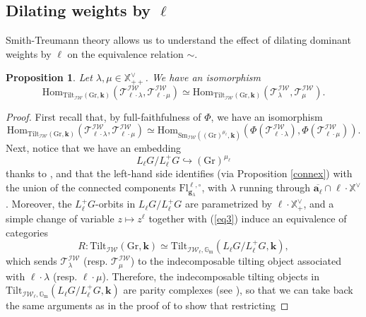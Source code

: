 \documentclass[11pt]{amsart}
\theoremstyle{plain}
\newtheorem{prop}[thm]{Proposition}
\theoremstyle{remark}
\numberwithin{equation}{section}
\begin{document}
	\subsection{Dilating weights by $\ell$}
	Smith-Treumann theory allows us to understand the effect of dilating dominant weights by $\ell$ on the equivalence relation $\sim$.
	\begin{prop}\label{red to non special}
		Let $\lambda,\mu\in\mathbb{X}^\vee_{++}$. We have an isomorphism
		$$\mathrm{Hom}_{\mathrm{Tilt}_\mathcal{IW}(\mathrm{Gr},\mathbf{k})}(\mathscr{T}^\mathcal{IW}_{\ell\cdot\lambda},\mathscr{T}^\mathcal{IW}_{\ell\cdot\mu})\simeq \mathrm{Hom}_{\mathrm{Tilt}_\mathcal{IW}(\mathrm{Gr},\mathbf{k})}(\mathscr{T}^\mathcal{IW}_{\lambda},\mathscr{T}^\mathcal{IW}_{\mu}).$$
	\end{prop}
	\begin{proof}
	    First recall that, by full-faithfulness of $\Phi$, we have an isomorphism
	    \begin{equation}\label{fulfaith1}
	        \mathrm{Hom}_{\mathrm{Tilt}_\mathcal{IW}(\mathrm{Gr},\mathbf{k})}(\mathscr{T}^\mathcal{IW}_{\ell\cdot\lambda},\mathscr{T}^\mathcal{IW}_{\ell\cdot\mu})\simeq\mathrm{Hom}_{\mathrm{Sm}_{\mathcal{IW}}((\mathrm{Gr})^{\mu_\ell},\mathbf{k})}(\Phi(\mathscr{T}^\mathcal{IW}_{\ell\cdot\lambda}),\Phi(\mathscr{T}^\mathcal{IW}_{\ell\cdot\mu})). 
	    \end{equation}
	    Next, notice that we have an embedding $$L_\ell G/L^+_\ell G\hookrightarrow (\mathrm{Gr})^{\mu_\ell}$$ thanks to \cite[Remark 4.8]{riche2020smithtreumann}, and that the left-hand side identifies (via Proposition \ref{connex}) with the union of the connected components $\mathrm{Fl}^{\ell,\circ}_{\mathbf{g}_\lambda}$, with $\lambda$ running through $\overline{\mathbf{a}_\ell}\cap\ell\cdot\mathbb{X}^\vee$.  Moreover, the $L^+_\ell G$-orbits in $L_\ell G/L^+_\ell G$ are parametrized by $\ell\cdot\mathbb{X}_+^\vee$, and a simple change of variable $z\mapsto z^\ell$ together with (\ref{eq3}) induce an equivalence of categories $$R:\mathrm{Tilt}_{\mathcal{IW}}(\mathrm{Gr},\mathbf{k})\simeq \mathrm{Tilt}_{\mathcal{IW}_\ell,\mathbb{G}_\mathrm{m}}(L_\ell G/L^+_\ell G,\mathbf{k}),$$
	    which sends $\mathscr{T}^\mathcal{IW}_{\lambda}$ (resp. $\mathscr{T}^\mathcal{IW}_{\mu}$) to the indecomposable tilting object associated with $\ell\cdot\lambda$ (resp. $\ell\cdot\mu$).  Therefore, the indecomposable tilting objects in $\mathrm{Tilt}_{\mathcal{IW}_\ell,\mathbb{G}_\mathrm{m}}(L_\ell G/L^+_\ell G,\mathbf{k})$ are parity complexes (see \cite[Proposition 4.12]{JEP_2019__6__707_0}), so that we can take back the same arguments as in the proof of \cite[Theorem 7.4]{riche2020smithtreumann} to show that restricting

\end{proof}
\end{document}
